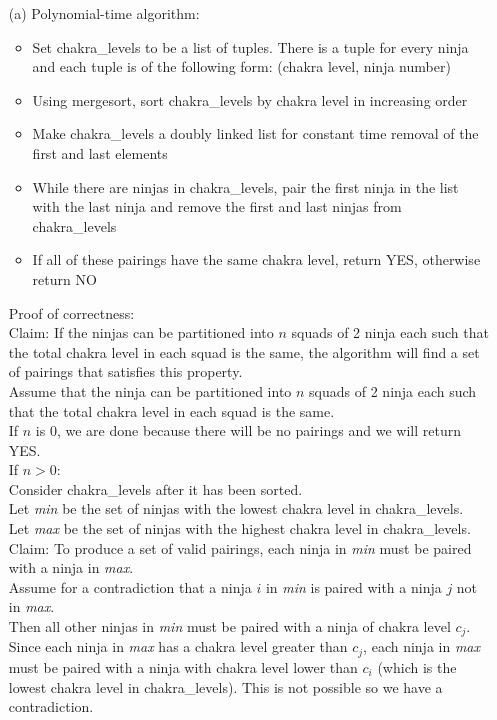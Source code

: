 \documentclass{article}
\begin{document}
\begin{enumerate}
    \item[(a)] Polynomial-time algorithm:
    \begin{itemize}
        \item Set chakra\_levels to be a list of tuples. There is a tuple for every ninja and each tuple is of the following form: (chakra level, ninja number)
        \item Using mergesort, sort chakra\_levels by chakra level in increasing order
        \item Make chakra\_levels a doubly linked list for constant time removal of the first and last elements
        \item While there are ninjas in chakra\_levels, pair the first ninja in the list with the last ninja and remove the first and last ninjas from chakra\_levels
        \item If all of these pairings have the same chakra level, return YES, otherwise return NO
    \end{itemize}
    
    Proof of correctness:\\
    Claim: If the ninjas can be partitioned into $n$ squads of 2 ninja each such that the total chakra level in each squad is the same, the algorithm will find a set of pairings that satisfies this property.\\
    Assume that the ninja can be partitioned into $n$ squads of 2 ninja each such that the total chakra level in each squad is the same.\\
    If $n$ is 0, we are done because there will be no pairings and we will return YES.\\
    If $n > 0$: \\
    Consider chakra\_levels after it has been sorted.\\
    Let \textit{min} be the set of ninjas with the lowest chakra level in chakra\_levels.\\
    Let \textit{max} be the set of ninjas with the highest chakra level in chakra\_levels.\\
    Claim: To produce a set of valid pairings, each ninja in \textit{min} must be paired with a ninja in \textit{max}. \\ 
    Assume for a contradiction that a ninja $i$ in \textit{min} is paired with a ninja $j$ not in \textit{max}. \\
    Then all other ninjas in \textit{min} must be paired with a ninja of chakra level $c_j$.\\
    Since each ninja in \textit{max} has a chakra level greater than $c_j$, each ninja in \textit{max} must be paired with a ninja with chakra level lower than $c_i $ (which is the lowest chakra level in chakra\_levels). This is not possible so we have a contradiction.
    

\end{enumerate}
\end{document}
